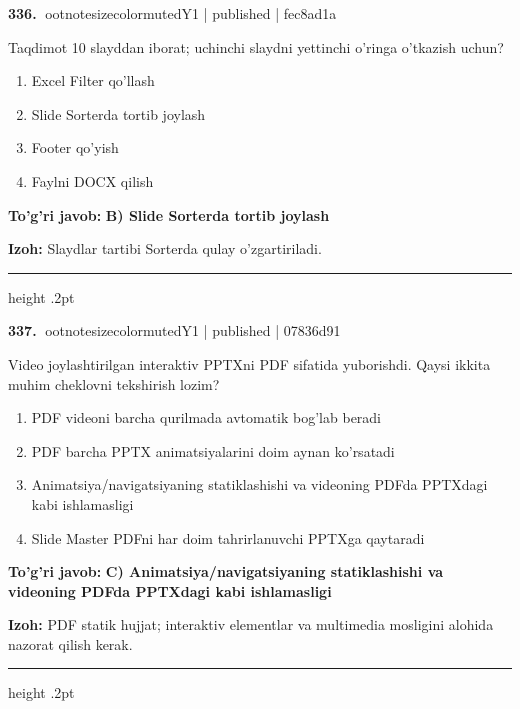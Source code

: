\documentclass[10pt,a4paper]{article}
\begin{document}
\textbf{\color{ink}336.} {ootnotesizecolor{muted}Y1 | published | fec8ad1a}
\par
Taqdimot 10 slayddan iborat; uchinchi slaydni yettinchi o'ringa o'tkazish uchun?
\begin{enumerate}[label=\Alph*),leftmargin=9mm]
\item Excel Filter qo'llash
\item Slide Sorterda tortib joylash
\item Footer qo'yish
\item Faylni DOCX qilish
\end{enumerate}
\begin{tcolorbox}[enhanced,breakable,colback=teal!4,colframe=teal!55!black,boxrule=0.45pt,arc=1.2mm,left=2.8mm,right=2.8mm,top=2mm,bottom=2mm]
\textbf{\color{teal}To'g'ri javob:} \textbf{B) Slide Sorterda tortib joylash}
\par\smallskip
\textbf{Izoh:} Slaydlar tartibi Sorterda qulay o'zgartiriladi.
\end{tcolorbox}
\vspace{2mm}\hrule height .2pt\vspace{2mm}

\textbf{\color{ink}337.} {ootnotesizecolor{muted}Y1 | published | 07836d91}
\par
Video joylashtirilgan interaktiv PPTXni PDF sifatida yuborishdi. Qaysi ikkita muhim cheklovni tekshirish lozim?
\begin{enumerate}[label=\Alph*),leftmargin=9mm]
\item PDF videoni barcha qurilmada avtomatik bog'lab beradi
\item PDF barcha PPTX animatsiyalarini doim aynan ko'rsatadi
\item Animatsiya/navigatsiyaning statiklashishi va videoning PDFda PPTXdagi kabi ishlamasligi
\item Slide Master PDFni har doim tahrirlanuvchi PPTXga qaytaradi
\end{enumerate}
\begin{tcolorbox}[enhanced,breakable,colback=teal!4,colframe=teal!55!black,boxrule=0.45pt,arc=1.2mm,left=2.8mm,right=2.8mm,top=2mm,bottom=2mm]
\textbf{\color{teal}To'g'ri javob:} \textbf{C) Animatsiya/navigatsiyaning statiklashishi va videoning PDFda PPTXdagi kabi ishlamasligi}
\par\smallskip
\textbf{Izoh:} PDF statik hujjat; interaktiv elementlar va multimedia mosligini alohida nazorat qilish kerak.
\end{tcolorbox}
\vspace{2mm}\hrule height .2pt\vspace{2mm}
\end{document}
